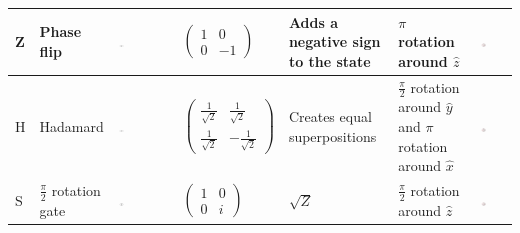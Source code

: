 \begin{table}[H]
\begin{tabular}{ C{0.3cm}  C{2cm}  C{1.5cm}  C{1.5cm} C{2.5cm} C{2cm} C{3.5cm}}
Z & Phase flip & \includegraphics[width=0.1\textwidth]{img/zcircuit.png} & $\begin{pmatrix}
 1 & 0 \\ 
 0 & -1
 \end{pmatrix}$ & Adds a negative sign to the \1 state & $\pi$ rotation around $\hat{z}$ & \includegraphics[width=0.2\textwidth]{img/blochzgate.png} \\\midrule 
H & Hadamard & \includegraphics[width=0.1\textwidth]{img/hcircuit.png}  & $\begin{pmatrix}
 \frac{1}{\sqrt{2}} & \frac{1}{\sqrt{2}} \\ 
 \frac{1}{\sqrt{2}} & -\frac{1}{\sqrt{2}}
 \end{pmatrix}$ & Creates equal superpositions & $\frac{\pi}{2}$ rotation around $\hat{y}$ and $\pi$ rotation around $\hat{x}$ & \includegraphics[width=0.2\textwidth]{img/blochhadamard.png}\\\midrule
S & $\frac{\pi}{2}$ rotation gate & \includegraphics[width=0.1\textwidth]{img/scircuit.png} & $\begin{pmatrix}
 1 & 0 \\ 
 0 & i
 \end{pmatrix}$ & $\sqrt{Z}$ & $\frac{\pi}{2}$ rotation around $\hat{z}$ &  \includegraphics[width=0.2\textwidth]{img/blochsgate.png}\\\midrule

\end{tabular}
\end{table}
